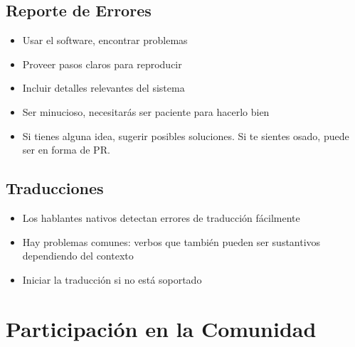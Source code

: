 \documentclass{presentacion}
\begin{document}
\subsection{Reporte de Errores}
\begin{frame}
    \begin{itemize}[<+->]
        \item Usar el software, encontrar problemas
        \item Proveer pasos claros para reproducir
        \item Incluir detalles relevantes del sistema
        \item Ser minucioso, necesitarás ser paciente para hacerlo bien
        \item Si tienes alguna idea, sugerir posibles soluciones. Si te sientes osado, puede ser en forma de PR.
    \end{itemize}  
    
    \vspace{1em}
\end{frame}

\subsection{Traducciones}
\begin{frame}
    \begin{itemize}[<+->]
        \item Los hablantes nativos detectan errores de traducción fácilmente
        \item Hay problemas comunes: verbos que también pueden ser sustantivos dependiendo del contexto
        \item Iniciar la traducción si no está soportado
    \end{itemize}
    
    \vspace{1em}
\end{frame}

\section{Participación en la Comunidad}
\end{document}
